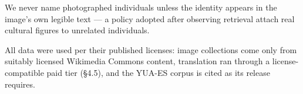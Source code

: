 \documentclass[11pt]{article}
\begin{document}
We never name photographed individuals unless the identity appears in the
image's own legible text --- a policy adopted after observing retrieval
attach real cultural figures to unrelated individuals.

All data were used per their published licenses: image collections come
only from suitably licensed Wikimedia Commons content, translation ran
through a license-compatible paid tier (\S4.5), and the YUA-ES corpus
\citep{molina2026yuaes} is cited as its release requires.



\end{document}
